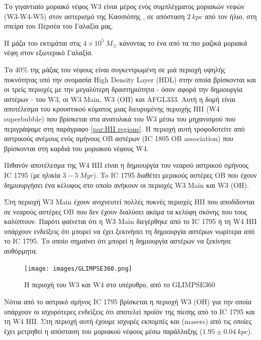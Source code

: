 \documentclass[a4paper,12pt]{memoir}
\newcommand{\e}[1]{\times 10^{#1}}
\begin{document}
Το γιγαντιαίο μοριακό νέφος W3 είναι μέρος ενός συμπλέγματος μοριακών νεφών (W3-W4-W5) στον αστερισμό της Κασσιόπης , σε απόσταση $2 \ kpc$ από τον ήλιο, στη σπείρα του Περσέα του Γαλαξία μας. 

Η μάζα του εκτιμάται στις $4\e{5} \ M_{\odot}$ κάνοντας το ένα από τα πιο μαζικά μοριακά νέφη στον εξωτερικό Γαλαξία.

Το 40\% της μάζας του νέφους είναι συγκεντρωμένη σε μιά περιοχή υψηλής πυκνότητας υπό την ονομασία High Density Layer (HDL) στην οποία βρίσκονται και οι τρείς περιοχές με την μεγαλύτερη δραστηριότητα - όσον αφορά την δημιουργία αστέρων - του 
W3, οι W3 Main, W3 (OH) και AFGL333. Αυτή η δομή είναι αποτέλεσμα του κρουστικού κύματος μιας διευρυμένης περιοχής HII (W4 superbubble) που βρίσκεται στα ανατολικά του W3 μέσω του μηχανισμού που περιγράψαμε στη παράγραφο \ref{par:HII regions}. Η περιοχή αυτή τροφοδοτείτε από αστρικούς ανέμους ενός σμήνους OB αστέρων (IC 1805 OB association) που βρίσκονται στη καρδιά του μοριακού νέφους W4.

Πιθανόν αποτέλεσμα της W4 HII είναι η δημιουργία του νεαρού αστρικού σμήνους IC 1795 (με ηλικία $3-5 \ Myr$). To IC 1795 διαθέτει μερικούς αστέρες OB που έχουν δημιουργήσει ένα κέλυφος στο οποίο ανήκουν οι περιοχές W3 Main και W3 (OH).

Στη περιοχή W3 Main έχουν ανιχνευτεί πολλές πυκνές περιοχές HII που αποδίδονται σε νεαρούς αστέρες OB που δεν έχουν διαλύσει ακόμα τα κελύφη σκόνης που τους καλύπτουν. Παρότι φαίνεται ότι η W3 Main διεγέρθηκε από το IC 1795 ή τη W4 HII υπάρχουν ενδείξεις ότι μπορεί να έχει ξεκινήσει τη δημιουργία αστέρων νωρίτερα από το IC 1795. Το οποίο σημαίνει ότι μπορεί η δημιουργία αστέρων να ξεκίνησε αυθόρμητα.


\begin{figure}[h!]
	\centering
	\texttt{[image: images/GLIMPSE360.png]}
	\caption{Η περιοχή του W3 και W4 στο υπέρυθρο, από το GLIMPSE360}
\end{figure}

Νότια από το αστρικό σμήνος IC 1795 βρίσκεται η περιοχή W3 (OH) για την οποία υπάρχουν οι ισχυρότερες ενδείξεις ότι αποτελεί προϊόν της πίεσης από το IC 1795 και τη  W4 HII. Στη περιοχή αυτή έχουμε ισχυρές εκπομπές  και  (masers) από τις οποίες έχει μετρηθεί η απόσταση του μοριακού νέφους μέσω παράλλαξης ($1.95 \pm 0.04 \ kpc$).
\end{document}
